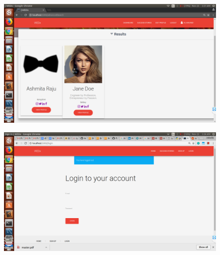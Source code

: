 \documentclass[12pt]{report}
\begin{document}
\begin{figure}[!htb]
    \centering
    \includegraphics[width=1\textwidth]{sc-24.png}
\end{figure}

\begin{figure}[!htb]
    \centering
    \includegraphics[width=1\textwidth]{sc-25.png}
\end{figure}
\end{document}
